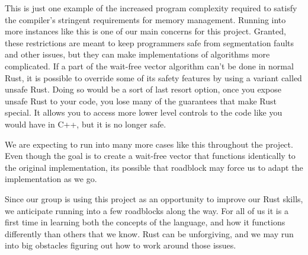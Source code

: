 \documentclass[conference]{IEEEtran}
\begin{document}
This is just one example of the increased program complexity required to satisfy the compiler's stringent requirements for memory management. Running into more instances like this is one of our main concerns for this project. Granted, these restrictions are meant to keep programmers safe from segmentation faults and other issues, but they can make implementations of algorithms more complicated. If a part of the wait-free vector algorithm can’t be done in normal Rust, it is possible to override some of its safety features by using a variant called unsafe Rust. Doing so would be a sort of last resort option, once you expose unsafe Rust to your code, you lose many of the guarantees that make Rust special. It allows you to access more lower level controls to the code like you would have in C++, but it is no longer safe.


We are expecting to run into many more cases like this throughout the project. Even though the goal is to create a wait-free vector that functions identically to the original implementation, its possible that roadblock may force us to adapt the implementation as we go.



Since our group is using this project as an opportunity to improve our Rust skills, we anticipate running into a few roadblocks along the way. For all of us it is a first time in learning both the concepts of the language, and how it functions differently than others that we know. Rust can be unforgiving, and we may run into big obstacles figuring out how to work around those issues.
\end{document}
